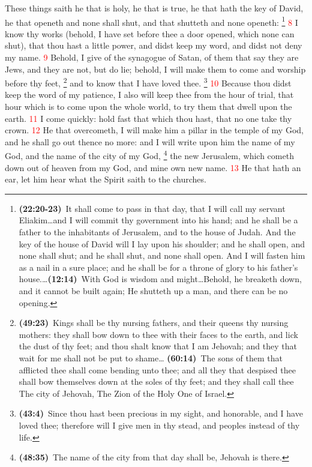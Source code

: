 \documentclass[12pt,twoside]{memoir}
\newcommand{\cbibleref}[3]{\textbf{\ibibleverse[textit]{#1}(#2)}\ {#3}}
\newcommand{\cbiblechvs}[3]{\textbf{\ibiblechvs[textit]{#1}(#2)}\ {#3}}
\newcommand{\cbiblefoot}[3]{\footnote{\cbibleref{#1}{#2}{#3}}}
\newcommand{\cbiblefootduo}[6]{\footnote{\cbibleref{#1}{#2}{#3}\ldots \cbibleref{#4}{#5}{#6}}}
\newcommand{\vnum}[1]{\textcolor{red}{\normalsize{#1}}}
\begin{document}
These things saith he that is holy, he that is true, he that hath the key of David, he that openeth and none shall shut, and that shutteth and none openeth:%
	\cbiblefootduo{Isaiah}{22:20-23}{It shall come to pass in that day, that I will call my servant Eliakim\ldots and I will commit thy government into his hand; and he shall be a father to the inhabitants of Jerusalem, and to the house of Judah. And the key of the house of David will I lay upon his shoulder; and he shall open, and none shall shut; and he shall shut, and none shall open. And I will fasten him as a nail in a sure place; and he shall be for a throne of glory to his father’s house.}%
				{Job}{12:14}{With God is wisdom and might\ldots Behold, he breaketh down, and it cannot be built again; He shutteth up a man, and there can be no opening.}
\vnum{8} I know thy works (behold, I have set before thee a door opened, which none can shut), that thou hast a little power, and didst keep my word, and didst not deny my name.  \vnum{9} Behold, I give of the synagogue of Satan, of them that say they are Jews, and they are not, but do lie; behold, I will make them to come and worship before thy feet,%
	\footnote{\cbibleref{Isaiah}{49:23}{Kings shall be thy nursing fathers, and their queens thy nursing mothers: they shall bow down to thee with their faces to the earth, and lick the dust of thy feet; and thou shalt know that I am Jehovah; and they that wait for me shall not be put to shame}\ldots%
				\cbiblechvs{Isaiah}{60:14}{The sons of them that afflicted thee shall come bending unto thee; and all they that despised thee shall bow themselves down at the soles of thy feet; and they shall call thee The city of Jehovah, The Zion of the Holy One of Israel.}}
 and to know that I have loved thee. %
 	\cbiblefoot{Isaiah}{43:4}{Since thou hast been precious in my sight, and honorable, and I have loved thee; therefore will I give men in thy stead, and peoples instead of thy life.}
\vnum{10} Because thou didst keep the word of my patience, I also will keep thee from the hour of trial, that hour which is to come upon the whole world, to try them that dwell upon the earth. %
\vnum{11} I come quickly: hold fast that which thou hast, that no one take thy crown. %
\vnum{12} He that overcometh, I will make him a pillar in the temple of my God, and he shall go out thence no more: and I will write upon him the name of my God, and the name of the city of my God,%
	\cbiblefoot{Ezekiel}{48:35}{The name of the city from that day shall be, Jehovah is there.}
 the new Jerusalem, which cometh down out of heaven from my God, and mine own new name. %
\vnum{13} He that hath an ear, let him hear what the Spirit saith to the churches.
\end{document}
